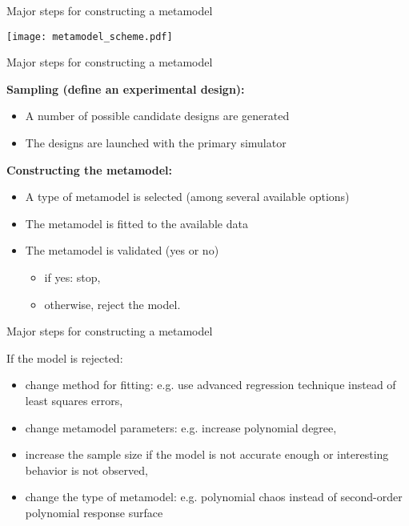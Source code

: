 \documentclass{beamer}
\begin{document}
\begin{frame}[t]{Major steps for constructing a metamodel}
 
\begin{center}
 \texttt{[image: metamodel\_scheme.pdf]} 
\end{center}

\end{frame}


\begin{frame}[t]{Major steps for constructing a metamodel}

{\bf Sampling (define an experimental design):} 
\begin{itemize}
\item A number of possible candidate designs are generated
\item The designs are launched with the primary simulator
\end{itemize}

{\bf Constructing the metamodel:}
\begin{itemize}
\item A type of metamodel is selected (among several available options)
\item The metamodel is fitted to the available data
\item The metamodel is validated (yes or no)
	\begin{itemize}
	\item if yes: stop,
	\item otherwise, reject the model.
	\end{itemize}
\end{itemize}

\end{frame}


\begin{frame}[t]{Major steps for constructing a metamodel}

If the model is rejected:
\begin{itemize}
 \item change method for fitting: e.g. use advanced regression technique instead of least squares errors,
 \item change metamodel parameters: e.g. increase polynomial degree,
 \item increase the sample size if the model is not accurate enough or interesting behavior is not observed,
 \item change the type of metamodel: e.g. polynomial chaos instead of second-order polynomial response surface
\end{itemize}	     

\end{frame}
\end{document}
